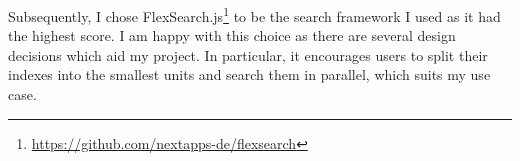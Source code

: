\documentclass[bsc,frontabs,oneside,singlespacing,parskip,deptreport,logo]{infthesis}
\begin{document}
\begin{table}[h]
\centering

\caption{Comparison of Search Frameworks\\
1 indicates feature is present, 0.5 indicates the feature does not work as expected, 0 indicates feature is not present and blank indicates there was no evidence for or against.}
\label{search-frameworks}
\end{table}

Subsequently, I chose FlexSearch.js\footnote{\url{https://github.com/nextapps-de/flexsearch}} to be the search framework I used as it had the highest score. I am happy with this choice as there are several design decisions which aid my project. In particular, it encourages users to split their indexes into the smallest units and search them in parallel, which suits my use case.
\end{document}
